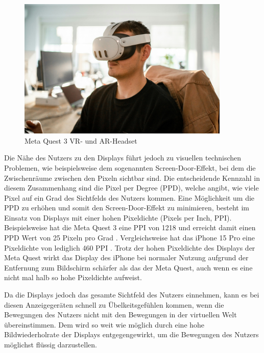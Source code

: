     \begin{figure}[H]
      \centering
      \includegraphics[width=0.9\textwidth]{images/quest3_example.jpg}
      \caption{Meta Quest 3 VR- und AR-Headset}
      \label{fig:oculus-quest-3}
    \end{figure}

    Die Nähe des Nutzers zu den Displays führt jedoch zu visuellen technischen Problemen, wie beispielsweise dem sogenannten Screen-Door-Effekt, bei dem die Zwischenräume zwischen den Pixeln sichtbar sind.
    Die entscheidende Kennzahl in diesem Zusammenhang sind die Pixel per Degree (PPD), welche angibt, wie viele Pixel auf ein Grad des Sichtfelds des Nutzers kommen.
    Eine Möglichkeit um die PPD zu erhöhen und somit den Screen-Door-Effekt zu minimieren, besteht im Einsatz von Displays mit einer hohen Pixeldichte (Pixels per Inch, PPI).
    Beispielsweise hat die Meta Quest 3 eine PPI von 1218 und erreicht damit einen PPD Wert von 25 Pixeln pro Grad \autocite[]{meta-quest-3}.
    Vergleichsweise hat das iPhone 15 Pro eine Pixeldichte von lediglich 460 PPI \autocite[]{iPhone15Pro-datenblatt}.
    Trotz der hohen Pixeldichte des Displays der Meta Quest wirkt das Display des iPhone bei normaler Nutzung aufgrund der Entfernung zum Bildschirm schärfer als das der Meta Quest, auch wenn es eine nicht mal halb so hohe Pixeldichte aufweist.

    Da die Displays jedoch das gesamte Sichtfeld des Nutzers einnehmen, kann es bei diesen Anzeigegeräten schnell zu Übelkeitsgefühlen kommen, wenn die Bewegungen des Nutzers nicht mit den Bewegungen in der virtuellen Welt übereinstimmen.
    Dem wird so weit wie möglich durch eine hohe Bildwiederholrate der Displays entgegengewirkt, um die Bewegungen des Nutzers möglichst flüssig darzustellen.

